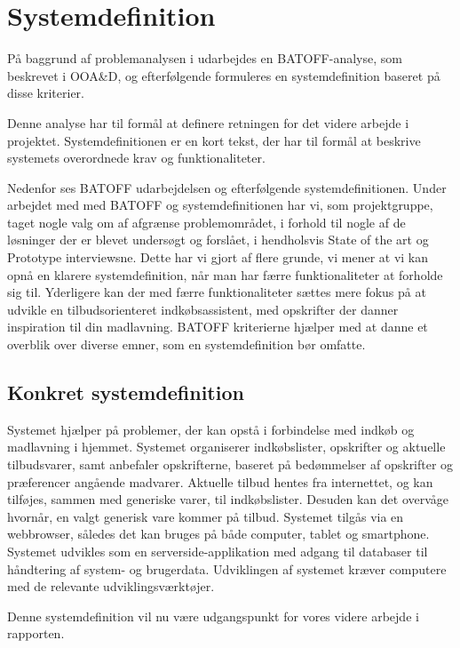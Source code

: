 \section{Systemdefinition}\label{sysdeffi}
På baggrund af problemanalysen i  udarbejdes en BATOFF-analyse, som beskrevet i OOA\&D\citep{OOA&D2001}, og efterfølgende formuleres en systemdefinition baseret på disse kriterier.

Denne analyse har til formål at definere retningen for det videre arbejde i projektet.
Systemdefinitionen er en kort tekst, der har til formål at beskrive systemets overordnede krav og funktionaliteter.

Nedenfor ses BATOFF udarbejdelsen og efterfølgende systemdefinitionen.
Under arbejdet med med BATOFF og systemdefinitionen har vi, som  projektgruppe, taget nogle valg om af afgrænse problemområdet, i forhold til nogle af de løsninger der er blevet undersøgt og forslået, i hendholsvis State of the art og Prototype interviewsne.
Dette har vi gjort af flere grunde, vi mener at vi kan opnå en klarere systemdefinition, når man har færre funktionaliteter at forholde sig til.
Yderligere kan der med færre funktionaliteter sættes mere fokus på at udvikle en tilbudsorienteret indkøbsassistent, med opskrifter der danner inspiration til din madlavning.
BATOFF kriterierne hjælper med at danne et overblik over diverse emner, som en systemdefinition bør omfatte.



\subsection{Konkret systemdefinition}\label{Sysdef}
Systemet hjælper på problemer, der kan opstå i forbindelse med indkøb og madlavning i hjemmet.
Systemet organiserer indkøbslister, opskrifter og aktuelle tilbudsvarer, samt anbefaler opskrifterne, baseret på bedømmelser af opskrifter og præferencer angående madvarer.
Aktuelle tilbud hentes fra internettet, og kan tilføjes, sammen med generiske varer, til indkøbslister.
Desuden kan det overvåge hvornår, en valgt generisk vare kommer på tilbud.
Systemet tilgås via en webbrowser, således det kan bruges på både computer, tablet og smartphone.
Systemet udvikles som en serverside-applikation med adgang til databaser til håndtering af system- og brugerdata.
Udviklingen af systemet kræver computere med de relevante udviklingsværktøjer.

Denne systemdefinition vil nu være udgangspunkt for vores videre arbejde i rapporten.
